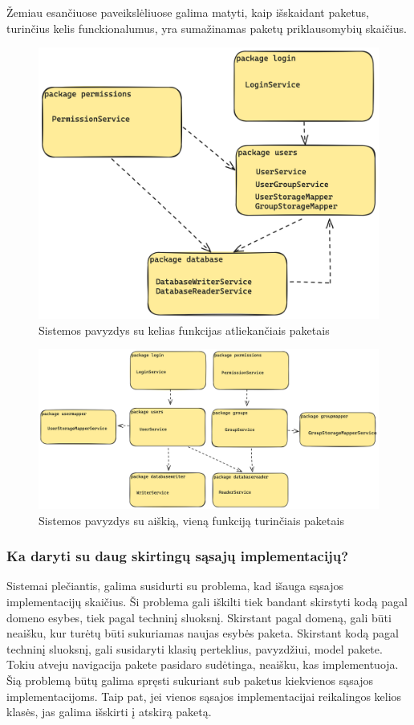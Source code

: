Žemiau esančiuose paveikslėliuose galima matyti, kaip išskaidant paketus, turinčius kelis funckionalumus, yra sumažinamas paketų
priklausomybių skaičius.
\begin{figure}[H]
    \centering
    \includegraphics[scale=0.15]{img/excesive_deps}
    \caption{Sistemos pavyzdys su kelias funkcijas atliekančiais paketais}
    \label{img:excesive_deps}
\end{figure}


\begin{figure}[H]
    \centering
    \includegraphics[scale=0.13]{img/good_deps}
    \caption{Sistemos pavyzdys su aiškią, vieną funkciją turinčiais paketais}
    \label{img:good_deps}
\end{figure}

\subsubsection{Ka daryti su daug skirtingų sąsajų implementacijų?}
Sistemai plečiantis, galima susidurti su problema, kad išauga sąsajos implementacijų skaičius. Ši problema gali iškilti
tiek bandant skirstyti kodą pagal domeno esybes, tiek pagal techninį sluoksnį. Skirstant pagal domeną, gali būti neaišku, kur turėtų
būti sukuriamas naujas esybės paketa. Skirstant kodą pagal techninį sluoksnį, gali susidaryti klasių perteklius, pavyzdžiui,
model pakete. Tokiu atveju navigacija pakete pasidaro sudėtinga, neaišku, kas implementuoja. Šią problemą būtų galima spręsti sukuriant
sub paketus kiekvienos sąsajos implementacijoms. Taip pat, jei vienos sąsajos implementacijai reikalingos kelios klasės, jas galima
išskirti į atskirą paketą.

